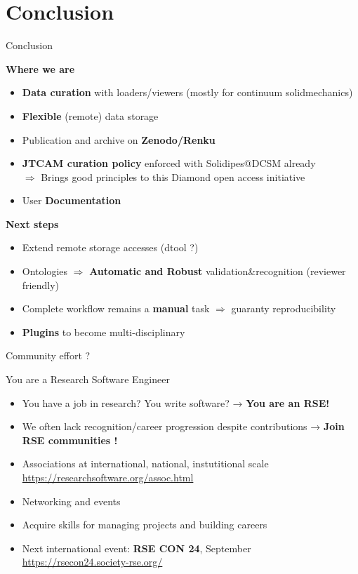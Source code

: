 \documentclass[10pt,compress,serif,aspectratio=169]{beamer}
\begin{document}
\section{Conclusion}
\begin{frame}[t]{Conclusion}

  \textbf{Where we are}  
  \begin{itemize}
  \item \textbf{Data curation} with loaders/viewers (mostly for continuum solidmechanics)
    \pause
  \item \textbf{Flexible} (remote) data storage
    \pause
  \item Publication and archive on \textbf{Zenodo/Renku}
    \pause
  \item \textbf{JTCAM curation policy} enforced with Solidipes@DCSM already\\\pause
  $\Rightarrow$ Brings good principles to this Diamond open access initiative
  \item User \textbf{Documentation}
  \end{itemize}
  \pause
  \vfill
  \textbf{Next steps}
  \begin{itemize}
    \item Extend remote storage accesses (dtool ?)
    \item Ontologies $\Rightarrow$ \textbf{Automatic and Robust} validation\&recognition (reviewer friendly)
    \item Complete workflow remains a \textbf{manual} task $\Rightarrow$ guaranty reproducibility
    \item \textbf{Plugins} to become multi-disciplinary
  \end{itemize}
\vfill
\pause
\begin{center}
    {\Large Community effort ?}
\end{center}
\end{frame}


\begin{frame}[t]{You are a Research Software Engineer}
\large
  \begin{itemize}
\item You have a job in research? You write software? → \textbf{You are an RSE!}
\item We often lack recognition/career progression despite contributions\newline 
\vfill
→ \textbf{Join RSE communities !}
\vfill
\item Associations at international, national, instutitional scale
\url{https://researchsoftware.org/assoc.html}
\item Networking and events
\item Acquire skills for managing projects and building careers
\item Next international event: \textbf{RSE CON 24}, September  \url{https://rsecon24.society-rse.org/}
\end{itemize}
\end{frame}
\end{document}
